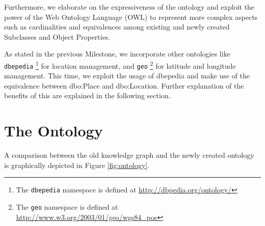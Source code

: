 \documentclass[runningheads,a4paper]{../../StyleFiles/llncs}
\begin{document}
Furthermore, we elaborate on the expressiveness of the ontology and exploit the power of the Web Ontology Language (OWL) to represent more complex aspects such as cardinalities and equivalences among existing and newly created Subclasses and Object Properties.

As stated in the previous Milestone, we incorporate other ontologies like \texttt{dbepedia} \footnote{The \texttt{dbepedia} namespace is defined at \url{http://dbpedia.org/ontology/}} for location management, and \texttt{geo} \footnote{The \texttt{geo} namespace is defined at \url{http://www.w3.org/2003/01/geo/wgs84_pos}} for latitude and longitude management. This time, we exploit the usage of dbepedia and make use of the equivalence between dbo:Place and dbo:Location. Further explanation of the benefits of this are explained in the following section.

\section{The Ontology}
A comparison between the old knowledge graph and the newly created ontology is graphically depicted in Figure \ref{fig:ontology}. 
\end{document}
